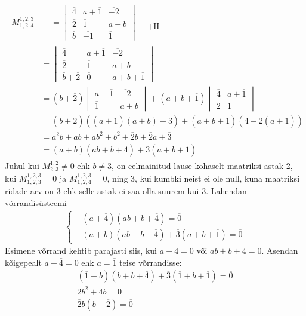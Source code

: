 \documentclass{article}
\newcommand\q[1]{\overline{#1}}
\begin{document}
\begin{gather*}
\begin{aligned}
M_{1,2,4}^{1,2,3}
&\begin{aligned}
&=\begin{vmatrix}\q{4} &a+\q{1} & \q{-2}\\\q{2} & \q{1} & a+b\\\q{b} & \q{-1} & \q{1}\end{vmatrix}
 & \begin{matrix}\\\\+\text{II} \end{matrix}\end{aligned}\\
&=\begin{vmatrix}\q{4} &a+\q{1} & \q{-2}\\\q{2} & \q{1} & a+b\\\q{b}+\q{2} & \q{0} & a+b+\q{1}\end{vmatrix}\\
&=(b+\q{2})\begin{vmatrix}a+\q{1} & \q{-2}\\\q{1} & a+b\end{vmatrix}+(a+b+\q{1})\begin{vmatrix}\q{4} & a+\q{1}\\\q{2} & \q{1}\end{vmatrix}\\
&=(b+\q{2})((a+\q{1})(a+b)+\q{3})+(a+b+\q{1})(\q{4}-\q{2}(a+\q{1}))\\
&=a^2b+ab+ab^2+b^2+\q{2}b+\q{2}a+\q{3}\\
&=(a+b)(ab+b+\q{4})+\q{3}(a+b+\q{1})
\end{aligned}
\end{gather*}
Juhul kui $M_{2,3}^{1,2}\neq0$ ehk $b\neq3$, on eelmainitud lause kohaselt maatriksi astak 2, kui $M_{1,2,3}^{1,2,3}=0$ ja $M_{1,2,4}^{1,2,3}=0$, ning 3, kui kumbki neist ei ole null, kuna maatriksi ridade arv on 3 ehk selle astak ei saa olla suurem kui 3. Lahendan võrrandisüsteemi
\begin{gather*}
\left\{
\begin{aligned}
&(a+\q{4})(ab+b+\q{4})=\q{0}\\
&(a+b)(ab+b+\q{4})+\q{3}(a+b+\q{1})=\q{0}
\end{aligned}\right.
\end{gather*}
Esimene võrrand kehtib parajasti siis, kui $a+\q{4}=0$ või $ab+b+\q{4}=0$. Asendan kõigepealt $a+\q{4}=0$ ehk $a=\q{1}$ teise võrrandisse:
\begin{gather*}
(\q{1}+b)(b+b+\q{4})+\q{3}(\q{1}+b+\q{1})=\q{0}\\
\q{2}b^2+\q{4}b=\q{0}\\
\q{2}b(b-\q{2})=\q{0}
\end{gather*}
\end{document}
